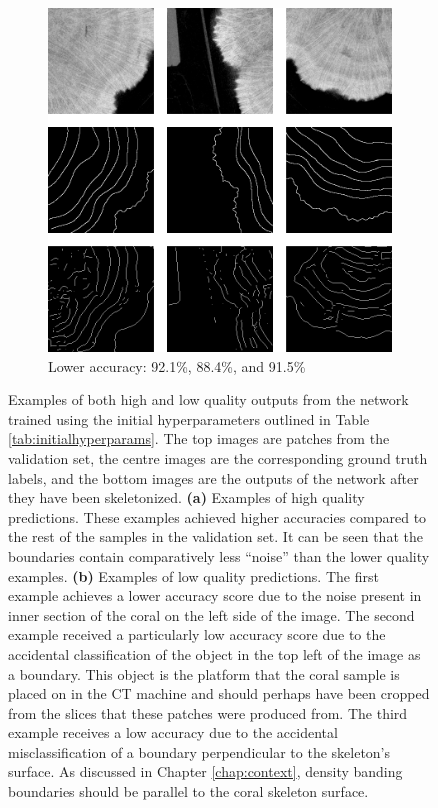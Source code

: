 \begin{figure}[t]
\begin{subfigure}[t]{0.58\textwidth}
        \includegraphics[width=1\textwidth, valign=c]{images/bad-initial.png}
        \caption{Lower accuracy: 92.1\%, 88.4\%, and 91.5\%}
    \end{subfigure}
    \caption{Examples of both high and low quality outputs from the network trained using the initial hyperparameters outlined in Table \ref{tab:initialhyperparams}. The top images are patches from the validation set, the centre images are the corresponding ground truth labels, and the bottom images are the outputs of the network after they have been skeletonized. \textbf{(a)} Examples of high quality predictions. These examples achieved higher accuracies compared to the rest of the samples in the validation set. It can be seen that the boundaries contain comparatively less ``noise'' than the lower quality examples. \textbf{(b)} Examples of low quality predictions. The first example achieves a lower accuracy score due to the noise present in inner section of the coral on the left side of the image. The second example received a particularly low accuracy score due to the accidental classification of the object in the top left of the image as a boundary. This object is the platform that the coral sample is placed on in the CT machine and should perhaps have been cropped from the slices that these patches were produced from. The third example receives a low accuracy due to the accidental misclassification of a boundary perpendicular to the skeleton's surface. As discussed in Chapter \ref{chap:context}, density banding boundaries should be parallel to the coral skeleton surface.}
    \label{fig:goodbad}
\end{figure}

